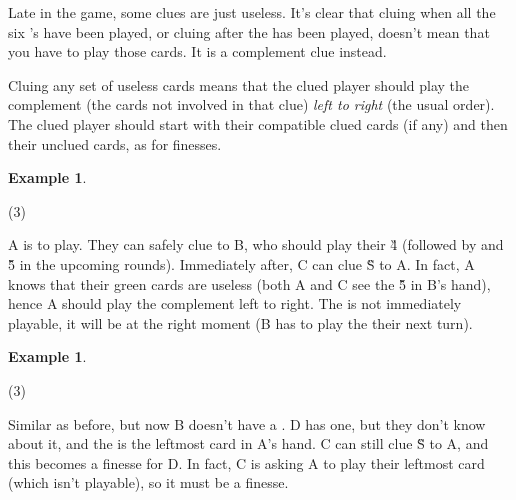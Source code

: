 \documentclass[a4paper]{article}
\theoremstyle{plain}
\theoremstyle{definition}
\newtheorem{example}[theorem]{Example}
\begin{document}
Late in the game, some clues are just useless. It's clear that cluing  when all the six 's have been played, or cluing  after the  has been played, doesn't mean that you have to play those cards. It is a complement clue instead.

Cluing any set of useless cards means that the clued player should play the complement (the cards not involved in that clue) \textit{left to right} (the usual order). The clued player should start with their compatible clued cards (if any) and then their unclued cards, as for finesses.

\begin{example}
	\hfill
	\begin{tasks}(3)
		\task[+]      
		\task[A]    
		\task[B]    
		\task[C]    
		\task[D]    
		\task[E]    
	\end{tasks}
	
	A is to play. They can safely clue  to B, who should play their \G{4} (followed by  and \G{5} in the upcoming rounds). Immediately after, C can clue \G{S} to A. In fact, A knows that their green cards are useless (both A and C see the \G{5} in B's hand), hence A should play the complement left to right. The  is not immediately playable, it will be at the right moment (B has to play the  their next turn).
\end{example}

\begin{example}
	\hfill
	\begin{tasks}(3)
		\task[+]      
		\task[A]    
		\task[B]    
		\task[C]    
		\task[D]    
		\task[E]    
	\end{tasks}
	
	Similar as before, but now B doesn't have a . D has one, but they don't know about it, and the  is the leftmost card in A's hand. C can still clue \G{S} to A, and this becomes a finesse for D. In fact, C is asking A to play their leftmost card (which isn't playable), so it must be a finesse.
\end{example}

%	
\end{document}
